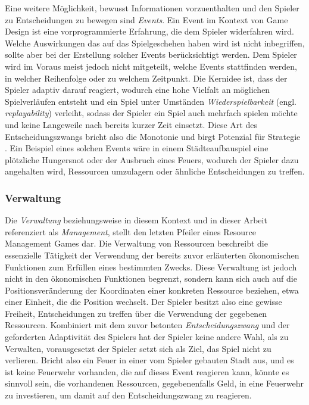 Eine weitere Möglichkeit, bewusst Informationen vorzuenthalten und den Spieler zu Entscheidungen zu bewegen sind \textit{Events}. Ein Event im Kontext von Game Design ist eine vorprogrammierte Erfahrung, die dem Spieler widerfahren wird. Welche Auswirkungen das auf das Spielgeschehen haben wird ist nicht inbegriffen, sollte aber bei der Erstellung solcher Events berücksichtigt werden. Dem Spieler wird im Voraus meist jedoch nicht mitgeteilt, welche Events stattfinden werden, in welcher Reihenfolge oder zu welchem Zeitpunkt. Die Kernidee ist, dass der Spieler adaptiv darauf reagiert, wodurch eine hohe Vielfalt an möglichen Spielverläufen entsteht und ein Spiel unter Umständen \textit{Wiederspielbarkeit} (engl. \textit{replayability}) verleiht, sodass der Spieler ein Spiel auch mehrfach spielen möchte und keine Langeweile nach bereits kurzer Zeit einsetzt. Diese Art des Entscheidungszwangs bricht also die Monotonie und birgt Potenzial für Strategie \cite*[]{article:events}. Ein Beispiel eines solchen Events wäre in einem Städteaufbauspiel eine plötzliche Hungersnot oder der Ausbruch eines Feuers, wodurch der Spieler dazu angehalten wird, Ressourcen umzulagern oder ähnliche Entscheidungen zu treffen.

\subsubsection{Verwaltung}
Die \textit{Verwaltung} beziehungsweise in diesem Kontext und in dieser Arbeit referenziert als \textit{Management}, stellt den letzten Pfeiler eines Resource Management Games dar. Die Verwaltung von Ressourcen beschreibt die essenzielle Tätigkeit der Verwendung der bereits zuvor erläuterten ökonomischen Funktionen zum Erfüllen eines bestimmten Zwecks. Diese Verwaltung ist jedoch nicht in den ökonomischen Funktionen begrenzt, sondern kann sich auch auf die Positionsveränderung der Koordinaten einer konkreten Ressource beziehen, etwa einer Einheit, die die Position wechselt. Der Spieler besitzt also eine gewisse Freiheit, Entscheidungen zu treffen über die Verwendung der gegebenen Ressourcen. Kombiniert mit dem zuvor betonten \textit{Entscheidungszwang} und der geforderten Adaptivität des Spielers hat der Spieler keine andere Wahl, als zu Verwalten, vorausgesetzt der Spieler setzt sich als Ziel, das Spiel nicht zu verlieren. 
Bricht also ein Feuer in einer vom Spieler gebauten Stadt aus, und es ist keine Feuerwehr vorhanden, die auf dieses Event reagieren kann, könnte es sinnvoll sein, die vorhandenen Ressourcen, gegebenenfalls Geld, in eine Feuerwehr zu investieren, um damit auf den Entscheidungszwang zu reagieren.